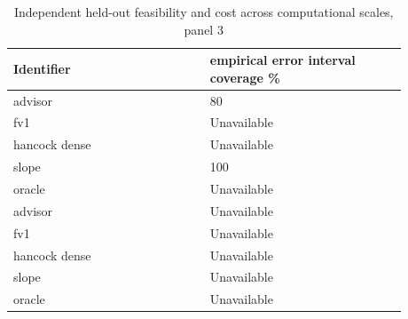 \begin{longtable}{p{0.4400\linewidth}p{0.4400\linewidth}}
\caption{Independent held-out feasibility and cost across computational scales, panel 3}\\
\hline
Identifier & empirical error interval coverage \% \\
\hline\endhead
advisor & 80 \\
fv1 & Unavailable \\
hancock dense & Unavailable \\
slope & 100 \\
oracle & Unavailable \\
advisor & Unavailable \\
fv1 & Unavailable \\
hancock dense & Unavailable \\
slope & Unavailable \\
oracle & Unavailable \\
\end{longtable}
\endgroup
